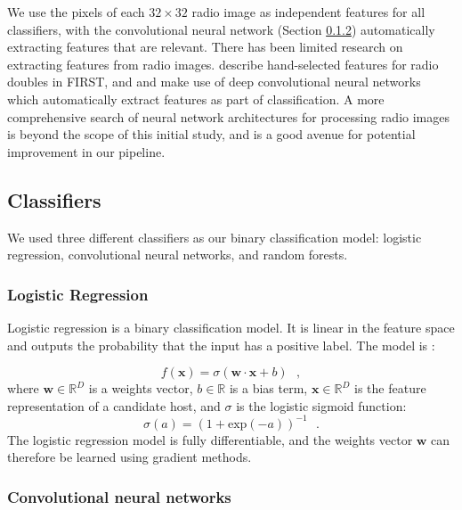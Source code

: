 \documentclass[fleqn,usenatbib,usedcolumn]{mnras}
\renewcommand{\vec}[1]{\mathbf{#1}}
\begin{document}
    We use the pixels of each $32 \times 32$ radio image as
    independent features for all classifiers, with the convolutional neural
    network (Section \ref{sec:convolutional-neural-networks}) automatically
    extracting features that are relevant.
    There has been limited research on extracting features from radio images.
    \citet{proctor06} describe hand-selected features for radio doubles in
    FIRST, and \citet{aniyan17cnn} and \citet{lukic17compact} make use of deep
    convolutional neural networks which automatically extract features as part
    of classification. A more comprehensive search of neural network architectures
    for processing radio images is beyond the scope of this initial study,
    and is a good avenue for potential improvement in our pipeline.

  \subsection{Classifiers}\label{sec:classifiers}

    We used three different classifiers as our binary classification model:
    logistic regression, convolutional neural networks, and random forests.

    \subsubsection{Logistic Regression}
    \label{sec:logistic-regression}
      Logistic regression is a binary classification model. It is linear in the
      feature space and outputs the probability that the input has a positive
      label. The model is \citep{bishop06ml}:

      \begin{equation}
          f(\vec x) = \sigma(\vec w \cdot \vec x + b) \,\,\,\,,
      \end{equation}
      where $\vec w \in \mathbb{R}^D$ is a weights vector,
      $b \in \mathbb{R}$ is a bias term, $\vec x \in \mathbb{R}^D$ is the
      feature representation of a candidate host, and $\sigma$ is the
      logistic sigmoid function: \begin{equation}
          \sigma(a) = (1 + \mathrm{exp}(-a))^{-1}\,\,\,\,.
      \end{equation}%
      The logistic regression model is fully differentiable, and the weights
      vector $\vec w$ can therefore be learned using gradient methods.

    \subsubsection{Convolutional neural networks}
    \label{sec:convolutional-neural-networks}
\end{document}
